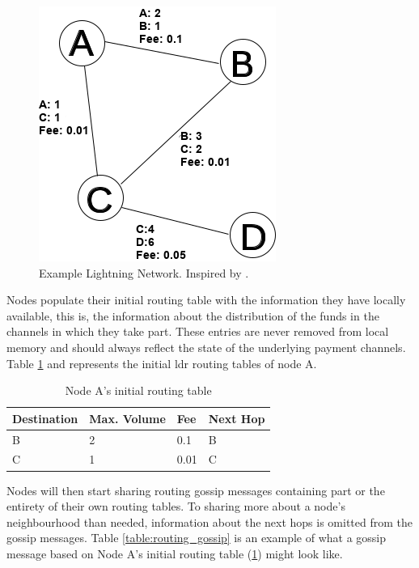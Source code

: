 \begin{figure}[H]
\begin{center}
  \includegraphics[width=0.6\linewidth]{images/networkabcd_cap.png}
  \caption{Example Lightning Network. Inspired by \cite{distance_vector}.}
  \label{fig:networkabcd}
  \end{center}
\end{figure}

Nodes populate their initial routing table with the information they have locally available, this is, the information about the distribution of the funds in the channels in which they take part. These entries are never removed from local memory and should always reflect the state of the underlying payment channels. Table \ref{table:routing_table_initial_a} and represents the initial \acrshort{ldr} routing tables of node A.

\begin{table}[H]
\centering
\begin{tabular}{|l|l|l|l|}
\hline
\rowcolor[HTML]{C0C0C0} 
Destination & Max. Volume   & Fee   & Next Hop \\ \hline
B           & 2             & 0.1   & B       \\ \hline
C           & 1             & 0.01  & C       \\ \hline
\end{tabular}
\caption{Node A's initial routing table}
\label{table:routing_table_initial_a}
\end{table}

Nodes will then start sharing routing gossip messages containing part or the entirety of their own routing tables. To sharing more about a node's neighbourhood than needed, information about the next hops is omitted from the gossip messages. Table \ref{table:routing_gossip} is an example of what a gossip message based on Node A's initial routing table (\ref{table:routing_table_initial_a}) might look like.

